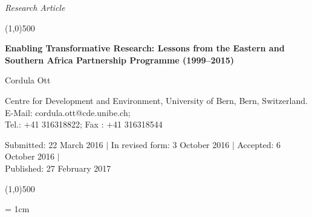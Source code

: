 \documentclass[10pt,a4paper]{article}
\begin{document}
\flushcolumns
\raggedcolumns



\pagestyle{document}
\thispagestyle{firstpage}


\vspace*{70pt}

\setlength{\parindent}{0cm}
\textit{Research Article}
\vspace*{-12pt}

\begin{center}
\line(1,0){500}
\end{center}

\vspace*{12pt}
\begin{flushleft}
\begin{LARGE}
\textbf{{\color{LibrelloColor} Enabling Transformative Research: Lessons from the Eastern and Southern Africa Partnership Programme (1999--2015)}}\\
\end{LARGE}

\vspace*{12pt}

Cordula Ott

\vspace*{6pt}

Centre for Development and Environment, University of Bern, Bern, Switzerland. E-Mail: cordula.ott@cde.unibe.ch; \\Tel.: +41 316318822; Fax	: +41 316318544

\vspace*{6pt}

%

Submitted: 22 March 2016 $\mid$ In revised form: 3 October 2016 $\mid$ Accepted: 6 October 2016 $\mid$\\
Published: 27 February 2017
\end{flushleft}
\setcounter{page}{15}


\vspace*{-18pt}
\begin{center}
\line(1,0){500}
\end{center}

\vspace*{12pt}

\begingroup\leftskip= 1cm\rightskip 1cm  
\end{document}
